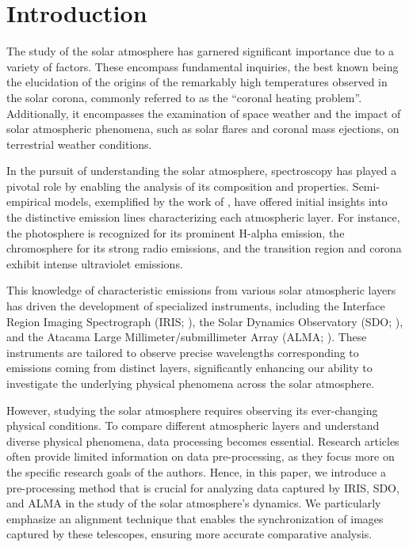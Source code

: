 \documentclass[a4paper,alpha-refs]{eSpectra}
\begin{document}

\section{Introduction}

The study of the solar atmosphere has garnered significant importance due to a variety of factors. These encompass fundamental inquiries, the best known being the elucidation of the origins of the remarkably high temperatures observed in the solar corona, commonly referred to as the ``coronal heating problem''. Additionally, it encompasses the examination of space weather and the impact of solar atmospheric phenomena, such as solar flares and coronal mass ejections, on terrestrial weather conditions.

In the pursuit of understanding the solar atmosphere, spectroscopy has played a pivotal role by enabling the analysis of its composition and properties. Semi-empirical models, exemplified by the work of \cite{vernazza_structure_1981}, have offered initial insights into the distinctive emission lines characterizing each atmospheric layer. For instance, the photosphere is recognized for its prominent H-alpha emission, the chromosphere for its strong radio emissions, and the transition region and corona exhibit intense ultraviolet emissions.

This knowledge of characteristic emissions from various solar atmospheric layers has driven the development of specialized instruments, including the  Interface Region Imaging Spectrograph (IRIS; \cite{depontieu_interface_2014_IRIS}), the Solar Dynamics Observatory (SDO; \cite{SDO_pesnell}), and the Atacama Large Millimeter/submillimeter Array (ALMA; \cite{wootten_atacama_2009}). These instruments are tailored to observe precise wavelengths corresponding to emissions coming from distinct layers, significantly enhancing our ability to investigate the underlying physical phenomena across the solar atmosphere.


However, studying the solar atmosphere requires observing its ever-changing physical conditions. To compare different atmospheric layers and understand diverse physical phenomena, data processing becomes essential. Research articles often provide limited information on data pre-processing, as they focus more on the specific research goals of the authors. Hence, in this paper, we introduce a pre-processing method that is crucial for analyzing data captured by IRIS, SDO, and ALMA in the study of the solar atmosphere’s dynamics. We particularly emphasize an alignment technique that enables the synchronization of images captured by these telescopes, ensuring more accurate comparative analysis.
\end{document}
